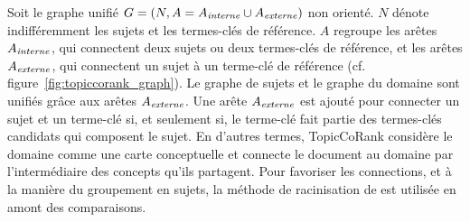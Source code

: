         Soit le graphe unifié $G = (N, A = A_{\textnormal{\textit{interne}}}
        \cup A_{\textnormal{\textit{externe}}})$ non orienté. $N$ dénote
        indifféremment les sujets et les termes-clés de référence. $A$ regroupe
        les arêtes $A_{\textnormal{\textit{interne}}}$, qui connectent deux
        sujets ou deux termes-clés de référence, et les arêtes
        $A_{\textnormal{\textit{externe}}}$, qui connectent un sujet à un
        terme-clé de référence (cf. figure~\ref{fig:topiccorank_graph}). Le
        graphe de sujets et le graphe du domaine sont unifiés grâce aux arêtes
        $A_{\textnormal{\textit{externe}}}$. Une arête
        $A_{\textnormal{\textit{externe}}}$ est ajouté pour connecter un sujet
        et un terme-clé si, et seulement si, le terme-clé fait partie des
        termes-clés candidats qui composent le sujet. En d'autres termes,
        TopicCoRank considère le domaine comme une carte conceptuelle et
        connecte le document au domaine par l'intermédiaire des concepts qu'ils
        partagent. Pour favoriser les connections, et à la manière du groupement
        en sujets, la méthode de racinisation de
         est utilisée en amont des
        comparaisons.
